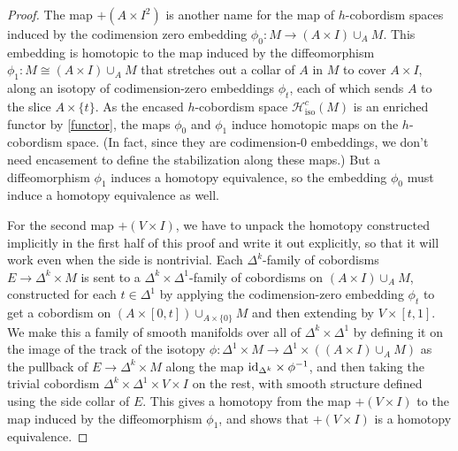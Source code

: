 \documentclass[11pt]{amsart}
\theoremstyle{definition}
\numberwithin{equation}{section}
\numberwithin{figure}{section}
\newcommand{\id}{\textup{id}}
\newcommand{\Hiso}{\mathcal{H}_{\iso}}
\newcommand{\iso}{\mathrm{iso}}
\begin{document}
\begin{proof}
	The map $+(A \times I^2)$ is another name for the map of $h$-cobordism spaces induced by the codimension zero embedding $\phi_0\colon M \to (A \times I) \cup_A M$. This embedding is homotopic to the map induced by the diffeomorphism $\phi_1\colon M \cong (A \times I) \cup_A M$ that stretches out a collar of $A$ in $M$ to cover $A \times I$, along an isotopy of codimension-zero embeddings $\phi_t$, each of which sends $A$ to the slice $A \times \{t\}$. As the encased $h$-cobordism space $\Hiso^c(M)$ is an enriched functor by \autoref{functor}, the maps $\phi_0$ and $\phi_1$ induce homotopic maps on the $h$-cobordism space. (In fact, since they are codimension-0 embeddings, we don't need encasement to define the stabilization along these maps.) But a diffeomorphism $\phi_1$ induces a homotopy equivalence, so the embedding $\phi_0$ must induce a homotopy equivalence as well. 
	
	For the second map $+(V \times I)$, we have to unpack the homotopy constructed implicitly in the first half of this proof and write it out explicitly, so that it will work even when the side is nontrivial. Each $\Delta^k$-family of cobordisms $E \to \Delta^k \times M$ is sent to a $\Delta^k \times \Delta^1$-family of cobordisms on $(A \times I) \cup_A M$, constructed for each $t \in \Delta^1$ by applying the codimension-zero embedding $\phi_t$ to get a cobordism on $(A \times [0,t]) \cup_{A \times \{0\}} M$ and then extending by $V \times [t,1]$. We make this a family of smooth manifolds over all of $\Delta^k \times \Delta^1$ by defining it on the image of the track of the isotopy $\phi\colon \Delta^1 \times M \to \Delta^1 \times ((A \times I) \cup_A M)$ as the pullback of $E \to \Delta^k \times M$ along the map $\id_{\Delta^k} \times \phi^{-1}$, and then taking the trivial cobordism $\Delta^k \times \Delta^1 \times V \times I$ on the rest, with smooth structure defined using the side collar of $E$. This gives a homotopy from the map $+(V \times I)$ to the map induced by the diffeomorphism $\phi_1$, and shows that $+(V \times I)$ is a homotopy equivalence.
\end{proof}
\end{document}
